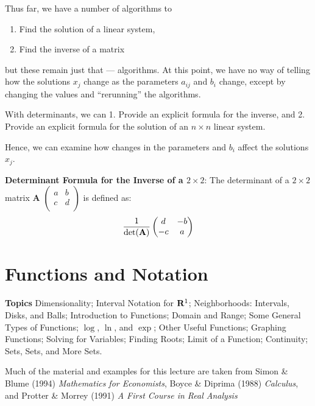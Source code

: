 \documentclass[]{book}
\providecommand{\tightlist}{%
  \setlength{\itemsep}{0pt}\setlength{\parskip}{0pt}}
\theoremstyle{definition}
\theoremstyle{definition}
\theoremstyle{definition}
\theoremstyle{remark}
\begin{document}
Thus far, we have a number of algorithms to

\begin{enumerate}
\def\labelenumi{\arabic{enumi}.}
\tightlist
\item
  Find the solution of a linear system,
\item
  Find the inverse of a matrix
\end{enumerate}

but these remain just that --- algorithms. At this point, we have no way
of telling how the solutions \(x_j\) change as the parameters \(a_{ij}\)
and \(b_i\) change, except by changing the values and ``rerunning'' the
algorithms.

With determinants, we can 1. Provide an explicit formula for the
inverse, and 2. Provide an explicit formula for the solution of an
\(n\times n\) linear system.

Hence, we can examine how changes in the parameters and \(b_i\) affect
the solutions \(x_j\).

\textbf{Determinant Formula for the Inverse of a \(2 \times 2\)}: The
determinant of a \(2 \times 2\) matrix \textbf{A}
\(\begin{pmatrix} a & b\\ c & d\\ \end{pmatrix}\) is defined as:
\[\frac{1}{\det({\bf A})} \begin{pmatrix}
            d & -b\\
            -c & a\\
        \end{pmatrix}\]

\chapter{Functions and Notation}\label{functions-and-notation}

\textbf{Topics} Dimensionality; Interval Notation for \({\bf R}^1\);
Neighborhoods: Intervals, Disks, and Balls; Introduction to Functions;
Domain and Range; Some General Types of Functions; \(\log\), \(\ln\),
and \(\exp\); Other Useful Functions; Graphing Functions; Solving for
Variables; Finding Roots; Limit of a Function; Continuity; Sets, Sets,
and More Sets.

Much of the material and examples for this lecture are taken from Simon
\& Blume (1994) \emph{Mathematics for Economists}, Boyce \& Diprima
(1988) \emph{Calculus}, and Protter \& Morrey (1991)
\emph{A First Course in Real Analysis}
\end{document}
